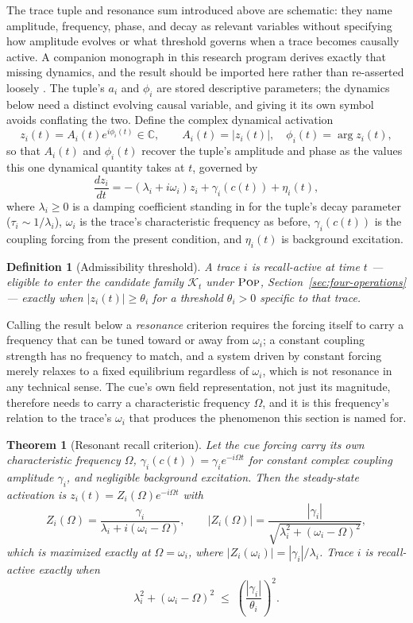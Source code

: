\documentclass[11pt]{article}
\newcommand{\Pop}{\textsc{Pop}}
\newtheorem{definition}{Definition}
\newtheorem{theorem}{Theorem}
\begin{document}
The trace tuple and resonance sum introduced above are schematic: they name amplitude, frequency, phase, and decay as relevant variables without specifying how amplitude evolves or what threshold governs when a trace becomes causally active. A companion monograph in this research program derives exactly that missing dynamics, and the result should be imported here rather than re-asserted loosely \cite{flyxionMem8Monograph}. The tuple's $a_i$ and $\phi_i$ are stored descriptive parameters; the dynamics below need a distinct evolving causal variable, and giving it its own symbol avoids conflating the two. Define the complex dynamical activation
\[
z_i(t) = A_i(t)e^{i\phi_i(t)} \in \mathbb{C}, \qquad A_i(t)=|z_i(t)|,\quad \phi_i(t)=\arg z_i(t),
\]
so that $A_i(t)$ and $\phi_i(t)$ recover the tuple's amplitude and phase as the values this one dynamical quantity takes at $t$, governed by
\[
\frac{dz_i}{dt} = -(\lambda_i+i\omega_i)z_i + \gamma_i(c(t)) + \eta_i(t),
\]
where $\lambda_i\geq 0$ is a damping coefficient standing in for the tuple's decay parameter ($\tau_i\sim 1/\lambda_i$), $\omega_i$ is the trace's characteristic frequency as before, $\gamma_i(c(t))$ is the coupling forcing from the present condition, and $\eta_i(t)$ is background excitation.

\begin{definition}[Admissibility threshold]
A trace $i$ is \emph{recall-active} at time $t$ --- eligible to enter the candidate family $\mathcal{K}_t$ under $\Pop$, Section~\ref{sec:four-operations} --- exactly when $|z_i(t)|\geq\theta_i$ for a threshold $\theta_i>0$ specific to that trace.
\end{definition}

Calling the result below a \emph{resonance} criterion requires the forcing itself to carry a frequency that can be tuned toward or away from $\omega_i$; a constant coupling strength has no frequency to match, and a system driven by constant forcing merely relaxes to a fixed equilibrium regardless of $\omega_i$, which is not resonance in any technical sense. The cue's own field representation, not just its magnitude, therefore needs to carry a characteristic frequency $\Omega$, and it is this frequency's relation to the trace's $\omega_i$ that produces the phenomenon this section is named for.

\begin{theorem}[Resonant recall criterion]
\label{thm:recall}
Let the cue forcing carry its own characteristic frequency $\Omega$, $\gamma_i(c(t)) = \gamma_i e^{-i\Omega t}$ for constant complex coupling amplitude $\gamma_i$, and negligible background excitation. Then the steady-state activation is $z_i(t) = Z_i(\Omega)e^{-i\Omega t}$ with
\[
Z_i(\Omega) = \frac{\gamma_i}{\lambda_i + i(\omega_i-\Omega)}, \qquad |Z_i(\Omega)| = \frac{|\gamma_i|}{\sqrt{\lambda_i^2+(\omega_i-\Omega)^2}},
\]
which is maximized exactly at $\Omega=\omega_i$, where $|Z_i(\omega_i)|=|\gamma_i|/\lambda_i$. Trace $i$ is recall-active exactly when
\[
\lambda_i^2 + (\omega_i-\Omega)^2 \;\leq\; \left(\frac{|\gamma_i|}{\theta_i}\right)^2.
\]
\end{theorem}
\end{document}
